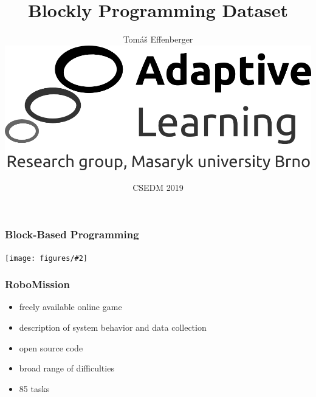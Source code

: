 \documentclass[bigger]{beamer}
\title{Blockly Programming Dataset}
\author{Tom\'a\v{s} Effenberger\\[4mm]
\includegraphics[width=.3\linewidth]{al-logo}\\[6mm]
}
\date{CSEDM 2019}
\newcommand{\img}[2]{
  \begin{center}
    \texttt{[image: figures/\#2]}
  \end{center}
}
\begin{document}
\frame{\titlepage}

\begin{frame}
  \frametitle{Block-Based Programming}


  \img{1.0}{robomission-tasks}

\end{frame}


\begin{frame}
  \frametitle{RoboMission}

  \begin{itemize}
  \item freely available online game
  \item description of system behavior and data collection
  \item open source code
  \item broad range of difficulties  %
  \item 85 tasks  %
  \end{itemize}
\end{frame}
\end{document}

